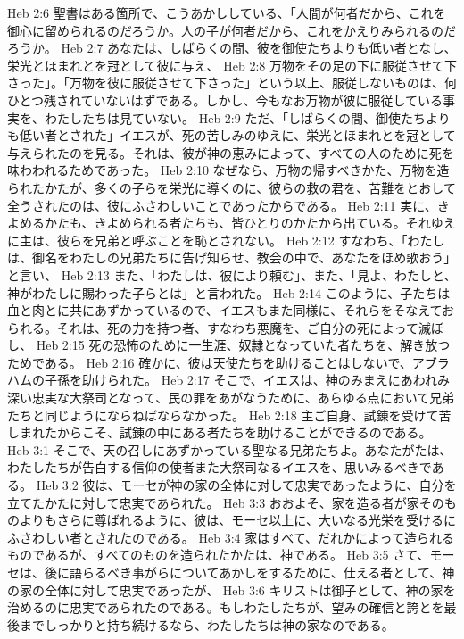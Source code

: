 Heb 2:6  聖書はある箇所で、こうあかししている、「人間が何者だから、これを御心に留められるのだろうか。人の子が何者だから、これをかえりみられるのだろうか。
Heb 2:7  あなたは、しばらくの間、彼を御使たちよりも低い者となし、栄光とほまれとを冠として彼に与え、
Heb 2:8  万物をその足の下に服従させて下さった」。「万物を彼に服従させて下さった」という以上、服従しないものは、何ひとつ残されていないはずである。しかし、今もなお万物が彼に服従している事実を、わたしたちは見ていない。
Heb 2:9  ただ、「しばらくの間、御使たちよりも低い者とされた」イエスが、死の苦しみのゆえに、栄光とほまれとを冠として与えられたのを見る。それは、彼が神の恵みによって、すべての人のために死を味わわれるためであった。
Heb 2:10  なぜなら、万物の帰すべきかた、万物を造られたかたが、多くの子らを栄光に導くのに、彼らの救の君を、苦難をとおして全うされたのは、彼にふさわしいことであったからである。
Heb 2:11  実に、きよめるかたも、きよめられる者たちも、皆ひとりのかたから出ている。それゆえに主は、彼らを兄弟と呼ぶことを恥とされない。
Heb 2:12  すなわち、「わたしは、御名をわたしの兄弟たちに告げ知らせ、教会の中で、あなたをほめ歌おう」と言い、
Heb 2:13  また、「わたしは、彼により頼む」、また、「見よ、わたしと、神がわたしに賜わった子らとは」と言われた。
Heb 2:14  このように、子たちは血と肉とに共にあずかっているので、イエスもまた同様に、それらをそなえておられる。それは、死の力を持つ者、すなわち悪魔を、ご自分の死によって滅ぼし、
Heb 2:15  死の恐怖のために一生涯、奴隷となっていた者たちを、解き放つためである。
Heb 2:16  確かに、彼は天使たちを助けることはしないで、アブラハムの子孫を助けられた。
Heb 2:17  そこで、イエスは、神のみまえにあわれみ深い忠実な大祭司となって、民の罪をあがなうために、あらゆる点において兄弟たちと同じようにならねばならなかった。
Heb 2:18  主ご自身、試錬を受けて苦しまれたからこそ、試錬の中にある者たちを助けることができるのである。
Heb 3:1  そこで、天の召しにあずかっている聖なる兄弟たちよ。あなたがたは、わたしたちが告白する信仰の使者また大祭司なるイエスを、思いみるべきである。
Heb 3:2  彼は、モーセが神の家の全体に対して忠実であったように、自分を立てたかたに対して忠実であられた。
Heb 3:3  おおよそ、家を造る者が家そのものよりもさらに尊ばれるように、彼は、モーセ以上に、大いなる光栄を受けるにふさわしい者とされたのである。
Heb 3:4  家はすべて、だれかによって造られるものであるが、すべてのものを造られたかたは、神である。
Heb 3:5  さて、モーセは、後に語らるべき事がらについてあかしをするために、仕える者として、神の家の全体に対して忠実であったが、
Heb 3:6  キリストは御子として、神の家を治めるのに忠実であられたのである。もしわたしたちが、望みの確信と誇とを最後までしっかりと持ち続けるなら、わたしたちは神の家なのである。

